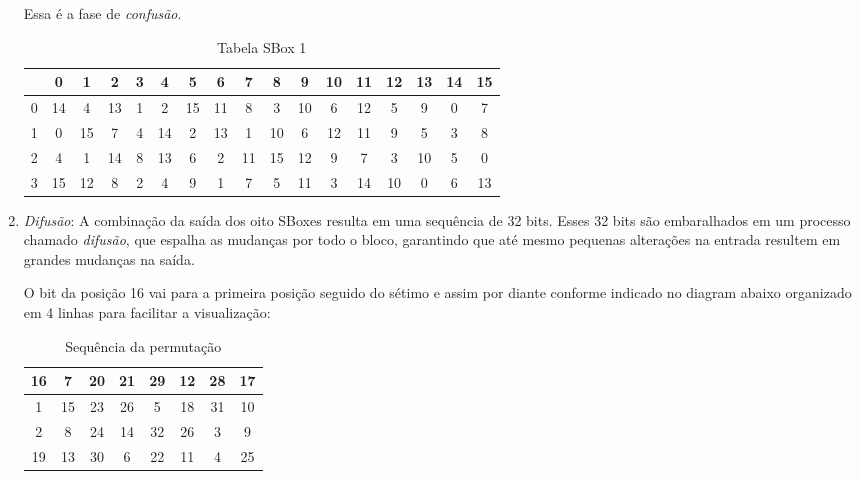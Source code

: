\begin{enumerate}
      Essa é a fase de \textit{confusão}.

\begin{table}[h!]
  \small %
\centering
\begin{tabular}{|c|cccccccccccccccc| }
\hline
  & 0  & 1  & 2  & 3 & 4  & 5  & 6  & 7  & 8  & 9  & 10 & 11 & 12 & 13 & 14 & 15 \\
\hline
0 & 14 & 4  & 13 & 1 & 2  & 15 & 11 & 8  & 3  & 10 & 6  & 12 & 5  & 9  & 0  & 7  \\
1 & 0  & 15 & 7  & 4 & 14 & 2  & 13 & 1  & 10 & 6  & 12 & 11 & 9  & 5  & 3  & 8  \\
2 & 4  & 1  & 14 & 8 & 13 & 6  & 2  & 11 & 15 & 12 & 9  & 7  & 3  & 10 & 5  & 0  \\
3 & 15 & 12 & 8  & 2 & 4  & 9  & 1  & 7  & 5  & 11 & 3  & 14 & 10 & 0  & 6  & 13 \\
\hline
\end{tabular}
  \label{tab:s1}
\caption{Tabela SBox 1}
\end{table}

      
    \item {\em Difusão}:
      A combinação da saída dos oito SBoxes resulta em uma sequência de 32 bits.
      Esses 32 bits são embaralhados em um processo chamado \textit{difusão}, que espalha as mudanças por todo o bloco, garantindo que até mesmo pequenas alterações na entrada resultem em grandes mudanças na saída.

      O bit da posição 16 vai para a primeira posição seguido do sétimo e assim por diante conforme indicado no diagram abaixo organizado em 4 linhas para facilitar a visualização:

\begin{table}[h!]
\centering
\begin{tabular}{|*{8}{c|}}
\hline
16 & 7  & 20 & 21 & 29 & 12 & 28 & 17 \\
\hline
1  & 15 & 23 & 26 & 5  & 18 & 31 & 10 \\
\hline
2  & 8  & 24 & 14 & 32 & 26 & 3  & 9  \\
\hline
19 & 13 & 30 & 6  & 22 & 11 & 4  & 25 \\
\hline
\end{tabular}
\caption{Sequência da permutação}
\end{table}
      
      
\end{enumerate}




